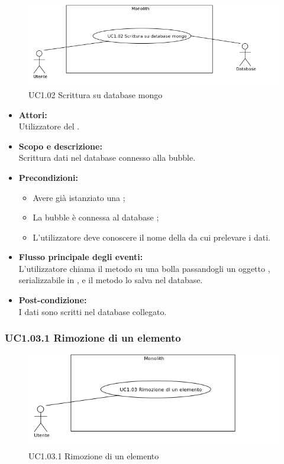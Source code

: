 \begin{figure}[H]
	\centering
	\includegraphics[width=15cm]{../../documenti/AnalisiDeiRequisiti/Diagrammi_img/uc1_02.png}
	\caption{UC1.02 Scrittura su database mongo}
\end{figure}

\begin{itemize}
\item \textbf{Attori:}
\\Utilizzatore del .
\item \textbf{Scopo e descrizione:} 
\\Scrittura dati nel database connesso alla bubble.
\item \textbf{Precondizioni:}
\begin{itemize}
	\item Avere già istanziato una ;
	\item La bubble è connessa al database ;
	\item L’utilizzatore deve conoscere il nome della  da cui prelevare i dati.
\end{itemize}
\item \textbf{Flusso principale degli eventi:}
\\L’utilizzatore chiama il metodo su una bolla passandogli un oggetto , serializzabile in , e il metodo lo salva nel database.
\item \textbf{Post-condizione:}
\\I dati sono scritti nel database collegato.
\end{itemize}

\subsubsection{UC1.03.1 Rimozione di un elemento} \label{UC1.03.1}

\begin{figure}[H]
	\centering
	\includegraphics[width=15cm]{../../documenti/AnalisiDeiRequisiti/Diagrammi_img/uc1_03.png}
	\caption{UC1.03.1 Rimozione di un elemento}
\end{figure}

